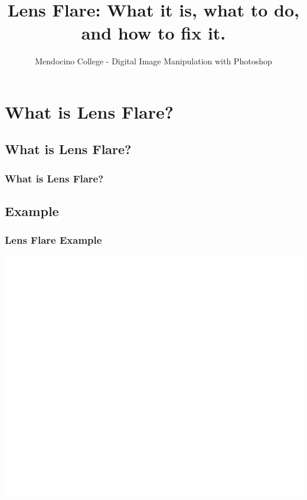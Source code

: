 \documentclass{beamer}
\title{Lens Flare: What it is, what to do, and how to fix it.}
\author{Mendocino College - Digital Image Manipulation with Photoshop}
\date{\vspace{-5em}}
\begin{document}
	{
		\begin{frame}
			\vspace{-35pt}
			\maketitle
		\end{frame}
	}
		
		
\section{What is Lens Flare?}

\subsection{What is Lens Flare?}		

	\begin{frame}
		\frametitle{What is Lens Flare?}
		\begin{outline}
			\1 
		\end{outline}
	\end{frame}

\subsection{Example}		
	\begin{frame}
		\frametitle{Lens Flare Example}
		\begin{center}
			\includegraphics[width=1.0\textwidth]{images/TOPIC example.png}
		\end{center}
	\end{frame}
\end{document}
